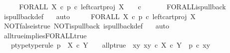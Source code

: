 \begin{isabellebody}
\ \ \isamarkupfalse%
\ \isamarkupfalse%
\ {\isachardoublequoteopen}FORALL\ X\ {\isasymcirc}\isactrlsub c\ {\isacharparenleft}{\kern0pt}p\ {\isasymcirc}\isactrlsub c\ left{\isacharunderscore}{\kern0pt}cart{\isacharunderscore}{\kern0pt}proj\ X\ {\isasymone}{\isacharparenright}{\kern0pt}\isactrlsup {\isasymsharp}\ {\isacharequal}{\kern0pt}\ {\isasymt}\ {\isasymcirc}\isactrlsub c\ {\isasymbeta}\isactrlbsub {\isasymone}\isactrlesub {\isachardoublequoteclose}\isanewline
\ \ \ \ \isamarkupfalse%
\ FORALL{\isacharunderscore}{\kern0pt}is{\isacharunderscore}{\kern0pt}pullback\ \isamarkupfalse%
\ is{\isacharunderscore}{\kern0pt}pullback{\isacharunderscore}{\kern0pt}def\ \ \isamarkupfalse%
\ auto\isanewline
\ \ \isamarkupfalse%
\ \isamarkupfalse%
\ {\isachardoublequoteopen}FORALL\ X\ {\isasymcirc}\isactrlsub c\ {\isacharparenleft}{\kern0pt}p\ {\isasymcirc}\isactrlsub c\ left{\isacharunderscore}{\kern0pt}cart{\isacharunderscore}{\kern0pt}proj\ X\ {\isasymone}{\isacharparenright}{\kern0pt}\isactrlsup {\isasymsharp}\ {\isacharequal}{\kern0pt}\ {\isasymt}{\isachardoublequoteclose}\isanewline
\ \ \ \ \isamarkupfalse%
\ NOT{\isacharunderscore}{\kern0pt}false{\isacharunderscore}{\kern0pt}is{\isacharunderscore}{\kern0pt}true\ NOT{\isacharunderscore}{\kern0pt}is{\isacharunderscore}{\kern0pt}pullback\ is{\isacharunderscore}{\kern0pt}pullback{\isacharunderscore}{\kern0pt}def\ \ \isamarkupfalse%
\ auto\isanewline
{}\isamarkupfalse%
%
\endisatagproof
{\isafoldproof}%
%
\isadelimproof
\isanewline
%
\endisadelimproof
\isanewline
{}\isamarkupfalse%
\ all{\isacharunderscore}{\kern0pt}true{\isacharunderscore}{\kern0pt}implies{\isacharunderscore}{\kern0pt}FORALL{\isacharunderscore}{\kern0pt}true{}{\isacharcolon}{\kern0pt}\isanewline
\ \ \ p{\isacharunderscore}{\kern0pt}type{\isacharbrackleft}{\kern0pt}type{\isacharunderscore}{\kern0pt}rule{\isacharbrackright}{\kern0pt}{\isacharcolon}{\kern0pt}\ {\isachardoublequoteopen}p\ {\isacharcolon}{\kern0pt}\ X\ {\isasymtimes}\isactrlsub c\ Y\ {\isasymrightarrow}\ {\isasymOmega}{\isachardoublequoteclose}\ \ all{\isacharunderscore}{\kern0pt}p{\isacharunderscore}{\kern0pt}true{\isacharcolon}{\kern0pt}\ {\isachardoublequoteopen}{\isasymAnd}\ xy{\isachardot}{\kern0pt}\ xy\ {\isasymin}\isactrlsub c\ X\ {\isasymtimes}\isactrlsub c\ Y\ {\isasymLongrightarrow}\ p\ {\isasymcirc}\isactrlsub c\ xy\ {\isacharequal}{\kern0pt}\ {\isasymt}{\isachardoublequoteclose}\isanewline

\end{isabellebody}
